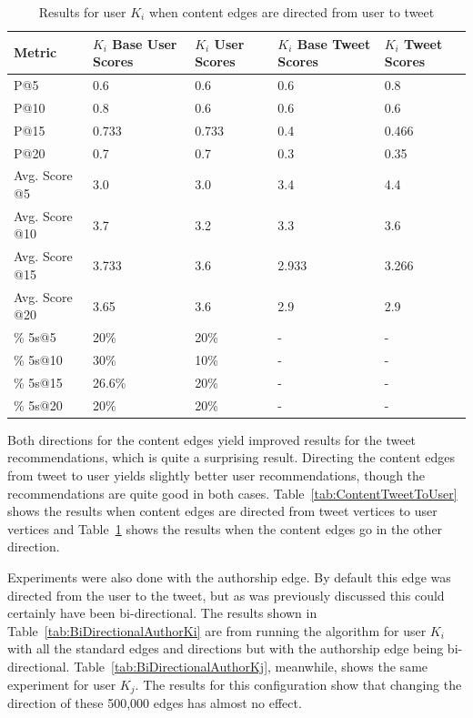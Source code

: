 \begin{table}
\centering
\begin{tabular}{l|p{2.2cm}|p{2.2cm}|p{2.2cm}|p{2.2cm}}
{\bf Metric} & {\bf $K_{i}$ Base User Scores} & {\bf $K_{i}$ User Scores} & {\bf $K_{i}$ Base Tweet Scores} & {\bf $K_{i}$ Tweet Scores} \\ \hline
P@5   & 0.6 & 0.6 & 0.6 & 0.8 \\ \hline
P@10 & 0.8 & 0.6 & 0.6 & 0.6 \\ \hline
P@15 & 0.733 & 0.733 & 0.4 & 0.466 \\ \hline
P@20 & 0.7 & 0.7 & 0.3 & 0.35 \\ \hline

Avg. Score @5   & 3.0 & 3.0 & 3.4 & 4.4 \\ \hline
Avg. Score @10 & 3.7 & 3.2 & 3.3 & 3.6 \\ \hline
Avg. Score @15 & 3.733 & 3.6 & 2.933 & 3.266 \\ \hline
Avg. Score @20 & 3.65 & 3.6 & 2.9 & 2.9 \\ \hline

\% 5s@5    & 20\% & 20\% & - & - \\ \hline
\% 5s@10  & 30\% & 10\% & - & - \\ \hline
\% 5s@15  & 26.6\% & 20\% & - & - \\ \hline
\% 5s@20  & 20\% & 20\% & - & - \\
\end{tabular}
\caption{Results for user $K_{i}$ when content edges are directed from user to tweet}
\label{tab:ContentUserToTweet}
\end{table}

Both directions for the content edges yield improved results for the tweet recommendations, which is quite a surprising result. Directing the content edges from tweet to user yields slightly better user recommendations, though the recommendations are quite good in both cases. Table~\ref{tab:ContentTweetToUser} shows the results when content edges are directed from tweet vertices to user vertices and Table~\ref{tab:ContentUserToTweet} shows the results when the content edges go in the other direction.


Experiments were also done with the authorship edge. By default this edge was directed from the user to the tweet, but as was previously discussed this could certainly have been bi-directional. The results shown in Table~\ref{tab:BiDirectionalAuthorKi} are from running the algorithm for user $K_{i}$ with all the standard edges and directions but with the authorship edge being bi-directional. Table~\ref{tab:BiDirectionalAuthorKj}, meanwhile, shows the same experiment for user $K_{j}$. The results for this configuration show that changing the direction of these 500,000 edges has almost no effect.

